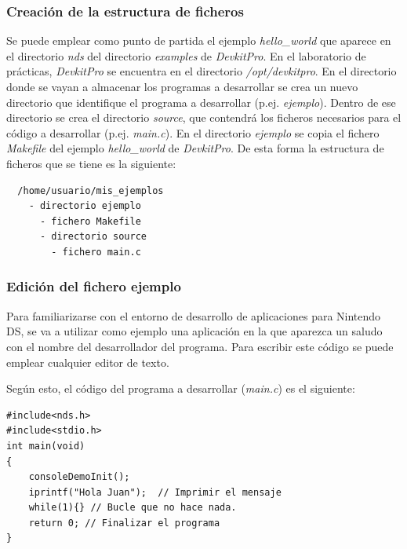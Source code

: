 \subsubsection{Creación de la estructura de ficheros}
Se puede emplear como punto de partida el ejemplo  \textit{hello\_world} que aparece en el directorio \textit{nds} del directorio \textit{examples} de  \textit{DevkitPro}. En  el laboratorio de prácticas, \textit{DevkitPro} se encuentra en el directorio \textit{/opt/devkitpro}. En el directorio donde se vayan a almacenar los programas a desarro\-llar se crea un nuevo directorio que identifique el programa a desarrollar (p.ej. \textit{ejemplo}). Dentro de ese directorio se crea el directorio \textit{source}, que contendrá los ficheros necesarios para el código a desarrollar (p.ej. \textit{main.c}). En el directorio \textit{ejemplo} se copia el fichero \textit{Makefile} del  ejemplo  \textit{hello\_world} de \textit{DevkitPro}. De esta forma la estructura de ficheros que se tiene es la siguiente:
\begin{verbatim}
  /home/usuario/mis_ejemplos
    - directorio ejemplo
      - fichero Makefile
      - directorio source
        - fichero main.c
\end{verbatim}

\subsubsection{Edición del fichero ejemplo}
Para familiarizarse con el entorno de desarrollo de aplicaciones para Nintendo DS, se va a utilizar como ejemplo una aplicación en la que aparezca un saludo con el nombre del desarrollador del programa. Para escribir este código se puede emplear cualquier editor de texto.

Según esto, el código del programa a desarrollar (\textit{main.c}) es el siguiente:
\begin{lstlisting}
#include<nds.h>
#include<stdio.h>
int main(void)
{
	consoleDemoInit();
    iprintf("Hola Juan");  // Imprimir el mensaje 
    while(1){} // Bucle que no hace nada.     
    return 0; // Finalizar el programa
}
\end{lstlisting}

